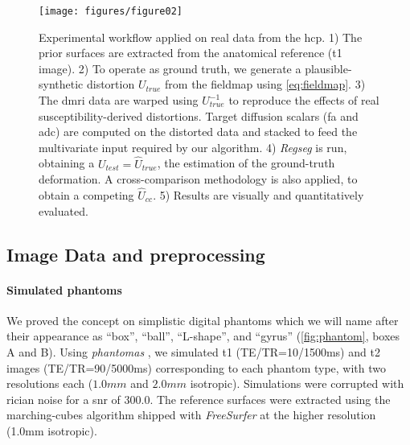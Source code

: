 \begin{figure*}
\texttt{[image: figures/figure02]}
\caption{Experimental workflow applied on real data from the \acrfull*{hcp}.
  1) The prior surfaces are extracted from the anatomical reference (\gls*{t1} image).
	2) To operate as ground truth, we generate a plausible-synthetic distortion $U_{true}$
	  from the fieldmap using \eqref{eq:fieldmap}.
	3) The \gls*{dmri} data are warped using $U^{-1}_{true}$ to reproduce the effects of real
	  susceptibility-derived distortions.
	Target diffusion scalars (\gls*{fa} and \gls*{adc}) are computed on the distorted data and
		stacked to feed the multivariate input required by our algorithm.
	4) \emph{Regseg} is run, obtaining a $U_{test} = \hat{U}_{true}$, the estimation of
	  the ground-truth deformation.
	  A cross-comparison methodology is also applied, to obtain a competing $\hat{U}_{cc}$.
	5) Results are visually and quantitatively evaluated.}\label{fig:evworkflows}
\end{figure*}


\subsection*{Image Data and preprocessing}
\label{sec:datasets}

\paragraph*{Simulated phantoms}%
\label{sec:digital_phantoms}
We proved the concept on simplistic digital phantoms which we will name after their
  appearance as ``box'', ``ball'', ``L-shape'', and ``gyrus'' (\autoref{fig:phantom},
  boxes A and B).
Using \emph{phantomas} \citep{caruyer_phantomas_2014}, we simulated
  \gls*{t1} (TE/TR=10/1500ms) and \gls*{t2} images (TE/TR=90/5000ms)
  corresponding to each phantom type, with two resolutions each
  ($1.0mm$ and $2.0mm$ isotropic).
Simulations were corrupted with rician noise for a \gls*{snr} of 300.0.
The reference surfaces were extracted using the marching-cubes algorithm
  shipped with \emph{FreeSurfer} \citep{fischl_freesurfer_2012}
  at the higher resolution (1.0mm isotropic).

